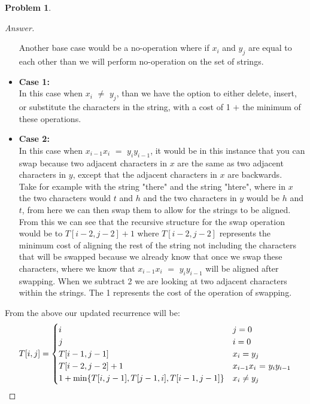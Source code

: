 \documentclass[11pt]{article}
\theoremstyle{definition}
\theoremstyle{definition}
\newtheorem{required}{Problem}
\theoremstyle{definition}
\begin{document}
\begin{required}
\begin{proof}[Answer]
\begin{itemize}
Another base case would be a no-operation where if $x_i$ and $y_j$ are equal to each other than we will perform no-operation on the set of strings. 
\item \textbf{Case 1:} \\
In this case when $x_i$ $\neq$ $y_j$, than we have the option to either delete, insert, or substitute the characters in the string, with a cost of 1 $+$ the minimum of these operations.
\item \textbf{Case 2: } \\
In this case when $x_{i-1} x_i$ $=$ $y_i y_{i-1}$, it would be in this instance that you can swap because two adjacent characters in $x$ are the same as two adjacent characters in $y$, except that the adjacent characters in $x$ are backwards. \\

Take for example with the string "there" and the string "htere", where in $x$ the two characters would $t$ and $h$ and the two characters in $y$ would be $h$ and $t$, from here we can then swap them to allow for the strings to be aligned. \\

From this we can see that the recursive structure for the swap operation would be to $T[i -2, j-2] + 1$ where $T[i -2, j-2]$ represents the minimum cost of aligning the rest of the string not including the characters that will be swapped because we already know that once we swap these characters, where we know that $x_{i-1} x_i$ $=$ $y_i y_{i-1}$
will be aligned after swapping. When we subtract 2 we are looking at two adjacent characters within the strings. The 1 represents the cost of the operation of swapping. \\
\end{itemize}

From the above our updated recurrence will be: \\
\[
T[i,j] = \begin{cases}
i & j = 0 \\
j & i = 0 \\
T[i-1,j-1] & x_i = y_j \\
T[i -2, j-2] + 1 & x_{i-1} x_i$ $=$ $y_i y_{i-1} \\
1 + \min\{T[i,j-1], T[j-1,i], T[i-1,j-1]\} & x_i \neq y_j
\end{cases}
\]




\end{proof}
\end{required}



\end{document}
